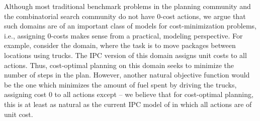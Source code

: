 

Although most traditional benchmark problems in the planning community and the combinatorial search community do not have 0-cost actions,
we argue that such domains are of an important class of models for cost-minimization problems, i.e.,
assigning 0-costs makes sense from a practical, modeling perspective.
For example, consider the  domain, where the task is to move packages between locations using trucks.
The IPC version of this domain assigns unit costs to all actions. Thus, cost-optimal planning on this domain seeks to minimize the number of steps in the plan.
However, another natural objective function would be the one which minimizes the amount of fuel spent by driving the trucks,
assigning cost 0 to all actions except  -- we believe that for cost-optimal planning, this is at least as natural as the current IPC model of  in which all actions are of unit cost.


